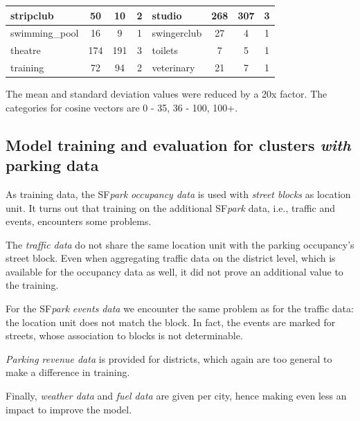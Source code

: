\begin{table}[!ht]
{\begin{tabular}{ | l | c | c | c || l | c | c | c |}
			stripclub & 50 & 10 & 2 & studio & 268 & 307 & 3 \\ \hline
			swimming\_pool & 16 & 9 & 1 & swingerclub & 27 & 4 & 1 \\ \hline
			theatre & 174 & 191 & 3 & toilets & 7 & 5 & 1 \\ \hline
			training & 72 & 94 & 2 & veterinary & 21 & 7 & 1 \\ \hline
	\end{tabular}}
	\label{tab:amenity_area_values}
	\begin{tabnote}
		The mean and standard deviation values were reduced by a 20x factor. The categories for cosine vectors are 0 - 35, 36 - 100, 100+.
	\end{tabnote}
\end{table}

\subsection{Model training and evaluation for clusters \emph{with} parking data}
\label{experimental_setup:model_training}
As training data, the SF\textit{park} \textit{occupancy data} is used with \textit{street blocks} as location unit. 
It turns out that training on the additional SF\textit{park} data, i.e., traffic and events, encounters some problems. 

The \textit{traffic data} do not share the same location unit with the parking occupancy's street block. Even when aggregating traffic data on the district level, which is available for the occupancy data as well, it did not prove an additional value to the training. 

For the SF\textit{park} \textit{events data} we encounter the same problem as for the traffic data: the location unit does not match the block. In fact, the events are marked for streets, whose association to blocks is not determinable. 

\textit{Parking revenue data} is provided for districts, which again are too general to make a difference in training.

Finally, \textit{weather data} and \textit{fuel data} are given per city, hence making even less an impact to improve the model.  


